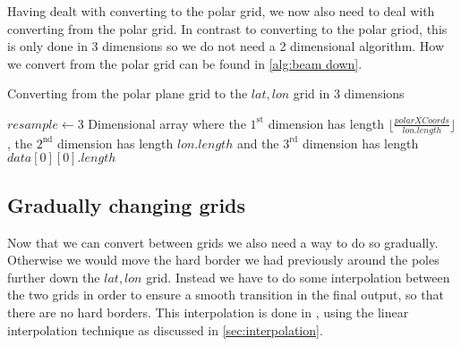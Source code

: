 Having dealt with converting to the polar grid, we now also need to deal with converting from the polar grid. In contrast to converting to the polar griod, this is only done in 3 dimensions so 
we do not need a 2 dimensional algorithm. How we convert from the polar grid can be found in \autoref{alg:beam down}.

\begin{algorithm}[htb]
    \caption{Converting from the polar plane grid to the $lat, lon$ grid in 3 dimensions}
    \label{alg:beam down}
    $resample \leftarrow $3 Dimensional array where the $1^{\text{st}}$ dimension has length $\lfloor \frac{polarXCoords}{lon.length} \rfloor$, the $2^{\text{nd}}$ dimension has length 
    $lon.length$ and the $3^{\text{rd}}$ dimension has length $data[0][0].length$ \;
\end{algorithm}

\subsection{Gradually changing grids}
Now that we can convert between grids we also need a way to do so gradually. Otherwise we would move the hard border we had previously around the poles further down the $lat, lon$ grid. Instead 
we have to do some interpolation between the two grids in order to ensure a smooth transition in the final output, so that there are no hard borders. This interpolation is done in , using the 
linear interpolation technique as discussed in \autoref{sec:interpolation}.

